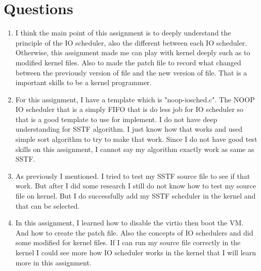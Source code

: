 \documentclass[letterpaper,11pt,titlepage]{article}
\begin{document}
\section{Questions}
\begin{enumerate}

\item I think the main point of this assignment is to deeply understand the principle of the IO scheduler, also the different between each IO scheduler. Otherwise, this assignment made me can 
play with kernel deeply such as to modified kernel files. Also to made the patch file to record what changed between the previously version of file and the new version of file. That is a important
skills to be a kernel programmer.  

\item For this assignment, I have a template which is "noop-iosched.c". The NOOP IO scheduler that is a simply FIFO that is do less job for IO scheduler so that is a good template to use for implement.
I do not have deep understanding for SSTF algorithm. I just know how that works and used simple sort algorithm to try to make that work. Since I do not have good test skills on this assignment, I cannot 
say my algorithm exactly work as same as SSTF. 

\item As previously I mentioned. I tried to test my SSTF source file to see if that work. But after I did some research I still do not know how to test my source file on kernel. But I do successfully add
my SSTF scheduler in the kernel and that can be selected.  

\item In this assignment, I learned how to disable the virtio then boot the VM. And how to create the patch file. Also the concepts of IO schedulers and did some modified for kernel files. If I can run my source file
correctly in the kernel I could see more how IO scheduler works in the kernel that I will learn more in this assignment.

\end{enumerate} 
\end{document}
